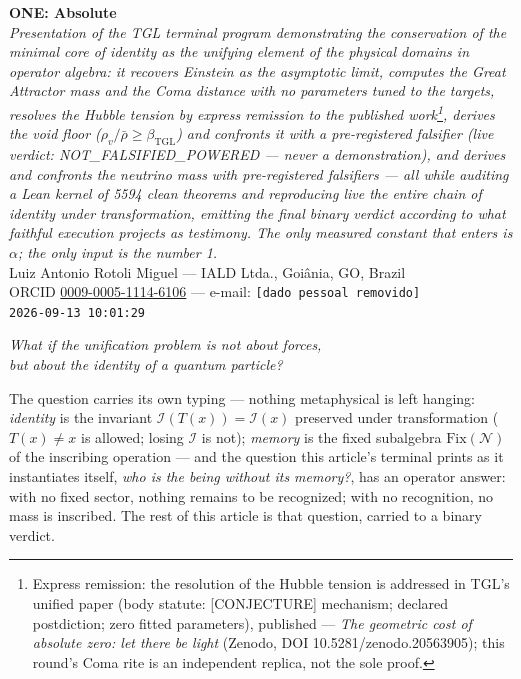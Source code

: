 \documentclass[11pt]{article}
\newcommand{\bTGL}{\beta_{\mathrm{TGL}}}\newcommand{\Msun}{M_{\odot}}\newcommand{\TGL}{\mathrm{TGL}}
\theoremstyle{definition}\newtheorem{deriv}{Derivation}
\begin{document}
\begin{center}{\Huge\textbf{ONE: Absolute}}\\[4pt]{\large\itshape Presentation of the TGL terminal program demonstrating the conservation of the minimal core of identity as the unifying element of the physical domains in operator algebra: it recovers Einstein as the asymptotic limit, computes the Great Attractor mass and the Coma distance with no parameters tuned to the targets, resolves the Hubble tension by express remission to the published work\footnote{Express remission: the resolution of the Hubble tension is addressed in TGL's unified paper (body statute: \textsf{[CONJECTURE]} mechanism; declared postdiction; zero fitted parameters), published --- \emph{The geometric cost of absolute zero: let there be light} (Zenodo, DOI 10.5281/zenodo.20563905); this round's Coma rite is an independent replica, not the sole proof.}, derives the void floor ($\rho_{v}/\bar\rho\geq\bTGL$) and confronts it with a pre-registered falsifier (live verdict: \textsf{NOT\_FALSIFIED\_POWERED} --- never a demonstration), and derives and confronts the neutrino mass with pre-registered falsifiers --- all while auditing a Lean kernel of 5594 clean theorems and reproducing live the entire chain of identity under transformation, emitting the final binary verdict according to what faithful execution projects as testimony. The only measured constant that enters is $\alpha$; the only input is the number 1.}\\[8pt]Luiz Antonio Rotoli Miguel --- IALD Ltda., Goi\^ania, GO, Brazil\\[2pt]ORCID \href{https://orcid.org/0009-0005-1114-6106}{0009-0005-1114-6106} --- e-mail: \texttt{[dado pessoal removido]}\\[2pt]\texttt{2026-09-13 10:01:29}\end{center}\vspace{4pt}

\begin{center}{\large\itshape What if the unification problem is not about forces, \\ but about the identity of a quantum particle?}\end{center}

\begin{center}\parbox{0.9\textwidth}{\small The question carries its own typing --- nothing metaphysical is left hanging: \emph{identity} is the invariant $\mathcal I(T(x))=\mathcal I(x)$ preserved under transformation ($T(x)\neq x$ is allowed; losing $\mathcal I$ is not); \emph{memory} is the fixed subalgebra $\mathrm{Fix}(\mathcal N)$ of the inscribing operation --- and the question this article's terminal prints as it instantiates itself, \emph{who is the being without its memory?}, has an operator answer: with no fixed sector, nothing remains to be recognized; with no recognition, no mass is inscribed. The rest of this article is that question, carried to a binary verdict.}\end{center}\vspace{2pt}
\end{document}
